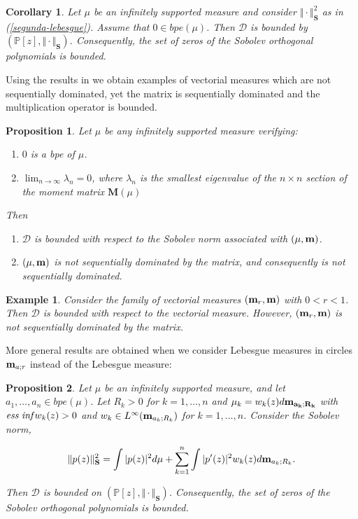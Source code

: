 \documentclass[12pt]{amsart}
\theoremstyle{definition}
\theoremstyle{plain}
\newtheorem{corollary}{Corollary}
\newtheorem{prop}{Proposition}
\newtheorem{ejem}{Example}
\theoremstyle{remark}
\begin{document}
\begin{corollary}    Let $\mu$ be an infinitely supported  measure and consider
$
\Vert \cdot \Vert^{2}_{\mathbf{S}}$ as in (\ref{segunda-lebesgue}). Assume that $0\in bpe(\mu)$. Then $\mathcal{D}$ is bounded by $(\mathbb{P}[z], \Vert \cdot \Vert_{\mathbf{S}})$. Consequently, the set of zeros of the Sobolev orthogonal polynomials is bounded.
\end{corollary}

\noindent Using the results in \cite{EGT1} we obtain examples of vectorial measures which are not sequentially dominated, yet the matrix is sequentially dominated and the multiplication operator is bounded. 

\begin{prop} Let $\mu$ be any infinitely supported measure verifying:
\begin{enumerate} 
\item $0$ is a bpe of $\mu$.
\item $\displaystyle{\lim_{n\to \infty} \lambda_n=0}$, where $\lambda_n$ is the smallest eigenvalue of the $n\times n$ section of the moment matrix $\mathbf{M}(\mu)$
\end{enumerate}
\noindent Then
\begin{enumerate}
\item $\mathcal{D}$  is bounded with respect to the Sobolev norm associated with $(\mu,{\bf m})$.
\item $(\mu,{\bf m})$ is not sequentially dominated by the matrix, and consequently is not sequentially dominated.
\end{enumerate}
\end{prop}


\begin{ejem}
 Consider the family of vectorial measures $({\bf m}_r,{\bf m})$ with $0<r<1$. Then $\mathcal{D}$ is bounded with respect to the vectorial measure. However, $({\bf m}_r,{\bf m})$ is not sequentially dominated by the matrix. 
 \end{ejem} 

\bigskip 

\noindent More general results are obtained when we consider Lebesgue measures in circles ${\bf m}_{a;r}$ instead of the Lebesgue measure: 
\begin{prop} Let $\mu$ be an infinitely supported measure, and let $a_1,\dots,a_{n}\in bpe(\mu)$. Let $R_k>0$ for $k=1,\dots, n$ and $\mu_k=w_k(z)d\bf{m}_{a_k;R_k}$ with ${\it ess \; inf} w_k(z)>0$ and $w_k\in L^{\infty}({\bf m}_{a_k;R_k})$ for $k=1,\dots,n$.
Consider the Sobolev norm, 

$$
\Vert p(z) \Vert^{2}_{\mathbf{S}}= \int \vert p(z) \vert^{2} d\mu +  \sum_{k=1}^{n} \int \vert p'(z) \vert^{2} w_k(z)d{\bf  m}_{a_k;R_k}.
$$


\noindent Then $\mathcal{D}$ is bounded on $(\mathbb{P}[z], \Vert \cdot \Vert_{\mathbf{S}})$. Consequently, the set of zeros of the Sobolev orthogonal polynomials is bounded. 
\end{prop}
\end{document}
